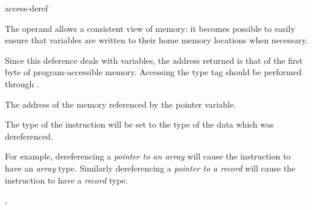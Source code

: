\begin{instruction}{access-deref}

  \begin{notes}
    The  operand allows a consistent view of
    memory: it becomes possible to easily ensure that variables are
    written to their home memory locations when necessary.

    Since this deference deals with variables, the address returned is
    that of the first byte of program-accessible memory.  Accessing
    the type tag should be performed through
    .
  \end{notes}

  \begin{results}
  \item The address of the memory referenced by the pointer variable.
  \end{results}

  \begin{dyntype}
  \item The type of the instruction will be set to the type of the
    data which was dereferenced.

    For example, dereferencing a \emph{pointer to an array} will cause
    the instruction to have an \emph{array} type.  Similarly
    dereferencing a \emph{pointer to a record} will cause the
    instruction to have a \emph{record} type.
  \end{dyntype}

  \begin{operands}
  \item {}
  \item {}
  \item {}
  \end{operands}

  \begin{seealso}
    , 
  \end{seealso}
\end{instruction}

